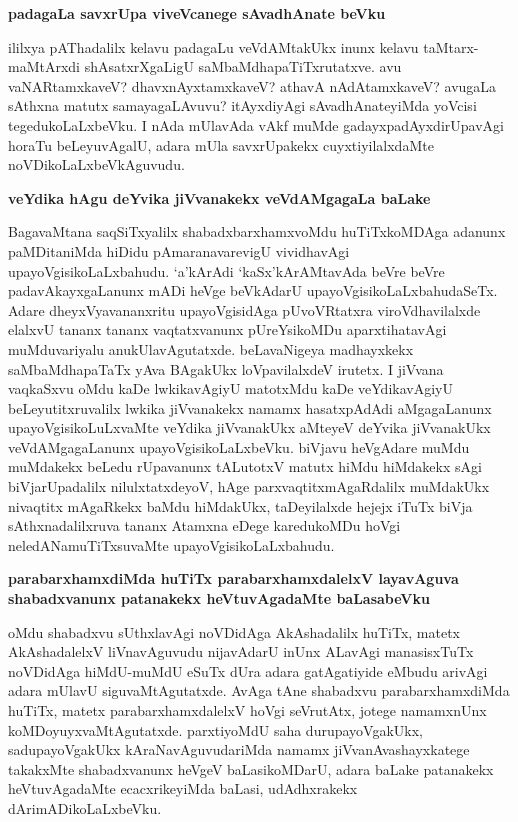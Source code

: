 \noindent
{\bf\large{padagaLa savxrUpa viveVcanege sAvadhAnate beVku}}\label{page191}

ililxya pAThadalilx kelavu padagaLu veVdAMtakUkx inunx kelavu taMtarx-maMtArxdi shAsatxrXgaLigU saMbaMdhapaTiTxrutatxve. avu vaNARtamxkaveV? dhavxnAyxtamxkaveV? athavA nAdAtamxkaveV? avugaLa sAthxna matutx samayagaLAvuvu? itAyxdiyAgi sAvadhAnateyiMda yoVcisi tegedukoLaLxbeVku. I nAda mUlavAda vAkf muMde gadayxpadAyxdirUpavAgi horaTu beLeyuvAgalU, adara mUla savxrUpakekx cuyxtiyilalxdaMte noVDikoLaLxbeVkAguvudu.

\noindent
{\bf\large{veYdika hAgu deYvika jiVvanakekx veVdAMgagaLa baLake}}\label{page191}

BagavaMtana saqSiTxyalilx shabadxbarxhamxvoMdu huTiTxkoMDAga adanunx paMDitaniMda hiDidu pAmaranavarevigU vividhavAgi upayoVgisikoLaLxbahudu. `a'kArAdi `kaSx'kArAMtavAda beVre beVre padavAkayxgaLanunx mADi heVge beVkAdarU upayoVgisikoLaLxbahudaSeTx. Adare dheyxVyavananxritu upayoVgisidAga pUvoVRtatxra viroVdhavilalxde elalxvU tananx tananx vaqtatxvanunx pUreYsikoMDu aparxtihatavAgi muMduvariyalu anukUlavAgutatxde. beLavaNigeya madhayxkekx saMbaMdhapaTaTx yAva BAgakUkx loVpavilalxdeV irutetx. I jiVvana vaqkaSxvu oMdu kaDe lwkikavAgiyU matotxMdu kaDe veYdikavAgiyU beLeyutitxruvalilx lwkika jiVvanakekx namamx hasatxpAdAdi aMgagaLanunx upayoVgisikoLuLxvaMte veYdika jiVvanakUkx aMteyeV deYvika jiVvanakUkx veVdAMgagaLanunx upayoVgisikoLaLxbeVku. biVjavu heVgAdare muMdu muMdakekx beLedu rUpavanunx tALutotxV matutx hiMdu hiMdakekx sAgi biVjarUpadalilx nilulxtatxdeyoV, hAge parxvaqtitxmAgaRdalilx muMdakUkx nivaqtitx mAgaRkekx baMdu hiMdakUkx, taDeyilalxde hejejx iTuTx biVja sAthxnadalilxruva tananx Atamxna eDege karedukoMDu hoVgi neledANamuTiTxsuvaMte upayoVgisikoLaLxbahudu.

\noindent
{\bf\large{parabarxhamxdiMda huTiTx parabarxhamxdalelxV layavAguva shabadxvanunx patanakekx heVtuvAgadaMte baLasabeVku}}\label{page193}

oMdu shabadxvu sUthxlavAgi noVDidAga AkAshadalilx huTiTx, matetx AkAshadalelxV liVnavAguvudu nijavAdarU inUnx ALavAgi manasisxTuTx noVDidAga hiMdU-muMdU eSuTx dUra adara gatAgatiyide eMbudu arivAgi adara mUlavU siguvaMtAgutatxde. AvAga tAne shabadxvu parabarxhamxdiMda huTiTx, matetx parabarxhamxdalelxV hoVgi seVrutAtx, jotege namamxnUnx koMDoyuyxvaMtAgutatxde. parxtiyoMdU saha durupayoVgakUkx, sadupayoVgakUkx kAraNavAguvudariMda namamx jiVvanAvashayxkatege takakxMte shabadxvanunx heVgeV baLasikoMDarU, adara baLake patanakekx heVtuvAgadaMte ecacxrikeyiMda baLasi, udAdhxrakekx dArimADikoLaLxbeVku.

